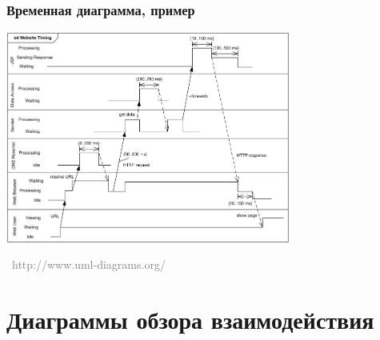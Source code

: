 \documentclass[xetex,mathserif,serif]{beamer}
\newcommand{\attribution}[1] {
    \vspace{-5mm}\begin{flushright}\begin{scriptsize}\textcolor{gray}{\textcopyright\, #1}\end{scriptsize}\end{flushright}
}
\begin{document}
    \begin{frame}
        \frametitle{Временная диаграмма, пример}
        \begin{center}
            \includegraphics[width=0.7\textwidth]{timingDiagramExample.png}
            \attribution{http://www.uml-diagrams.org/}
        \end{center}
    \end{frame}

    \section{Диаграммы обзора взаимодействия}
\end{document}

